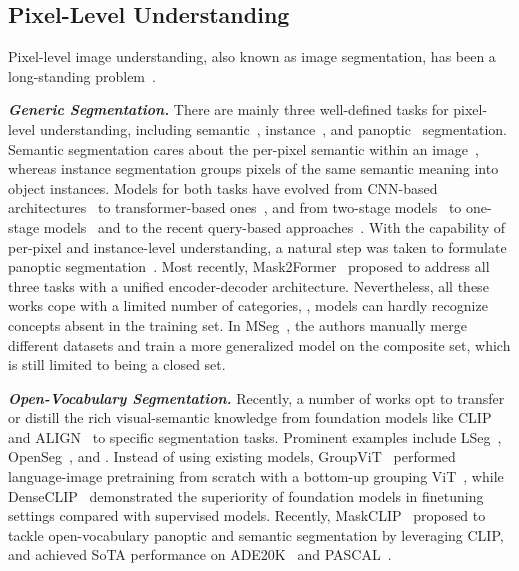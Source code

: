 \documentclass[10pt,twocolumn,letterpaper]{article}
\begin{document}
\subsection{Pixel-Level Understanding}

Pixel-level image understanding, also known as image segmentation, has been a long-standing problem~\cite{fu1981survey,pal1993review}. 

\textit{\textbf{Generic Segmentation.}} There are mainly three well-defined tasks for pixel-level understanding, including semantic~\cite{long2015fully}, instance~\cite{hafiz2020survey}, and panoptic~\cite{kirillov2019panoptic} segmentation. Semantic segmentation cares about the per-pixel semantic within an image~\cite{long2015fully, chen2017rethinking, chen2022vision}, whereas instance segmentation groups pixels of the same semantic meaning into object instances. Models for both tasks have evolved from CNN-based architectures~\cite{long2015fully} to transformer-based ones~\cite{chen2022vision}, and from two-stage models~\cite{he2017mask} to one-stage models~\cite{bolya2019yolact,tian2020conditional} and to the recent query-based approaches~\cite{dong2021solq,zou2022end}. With the capability of per-pixel and instance-level understanding, a natural step was taken to formulate panoptic segmentation~\cite{kirillov2019panoptic,wang2021max,cheng2022masked}. Most recently, Mask2Former~\cite{cheng2022masked}  proposed to address all three tasks with a unified encoder-decoder architecture. Nevertheless, all these works cope with a limited number of categories, \ie, models can hardly recognize concepts absent in the training set. In MSeg~\cite{lambert2020mseg}, the authors manually merge different datasets and train a more generalized model on the composite set, which is still limited to being a closed set.

\textit{\textbf{Open-Vocabulary Segmentation.}} Recently, a number of works opt to transfer or distill the rich visual-semantic knowledge from foundation models like CLIP~\cite{radford2021learning} and ALIGN~\cite{jia2021scaling} to specific segmentation tasks. Prominent examples include LSeg~\cite{li2022language}, OpenSeg~\cite{ghiasi2021open}, and \cite{huynh2022open}. Instead of using existing models, GroupViT~\cite{xu2022groupvit} performed language-image pretraining from scratch with a bottom-up grouping ViT~\cite{dosovitskiy2020image}, while DenseCLIP~\cite{rao2022denseclip} demonstrated the superiority of foundation models in finetuning settings compared with supervised models. Recently, MaskCLIP~\cite{ding2022open} proposed to tackle open-vocabulary panoptic and semantic segmentation by leveraging CLIP, and achieved SoTA performance on ADE20K~\cite{zhou2017scene} and PASCAL~\cite{mottaghi2014role,everingham2011pascal}.
\end{document}
